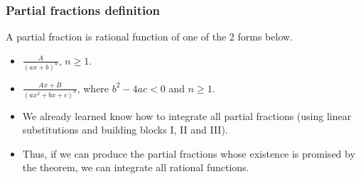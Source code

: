 \begin{frame}
\frametitle{Partial fractions definition}
\begin{definition} 
A partial fraction is rational function of one of the 2 forms below.
\begin{itemize}
\item $\frac{A}{(ax+b)^n} $, $n\geq 1$.
\item $\frac{Ax+B}{(ax^{2}+bx+c)^n}$, where $b^2-4ac<0$ and $n\geq 1$.
\end{itemize}
\end{definition}
\begin{itemize}
\item<3-> We already learned know how to integrate all partial fractions (using linear substitutions and building blocks I, II and III). 
\item<4-> Thus, if we can produce the partial fractions whose existence is promised by the theorem, we can integrate all rational functions.
\end{itemize}
\end{frame}